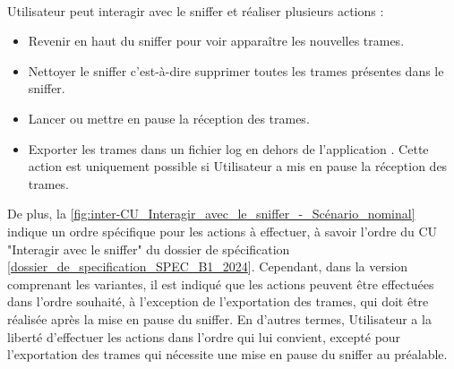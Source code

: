 \\
Utilisateur peut interagir avec le sniffer et réaliser plusieurs actions : 
\begin{itemize}
    \item Revenir en haut du sniffer pour voir apparaître les nouvelles trames. 
    \item Nettoyer le sniffer c'est-à-dire supprimer toutes les trames présentes dans le sniffer. 
    \item Lancer ou mettre en pause la réception des trames. 
    \item Exporter les trames dans un fichier log en dehors de l'application {\nomApplication}. Cette action est uniquement possible si Utilisateur a mis en pause la réception des trames.
\end{itemize}
De plus, la \autoref{fig:inter-CU_Interagir_avec_le_sniffer_-_Scénario_nominal} indique un ordre spécifique pour les actions à effectuer, à savoir l'ordre du CU "Interagir avec le sniffer" du dossier de spécification [\hyperref[SPEC]{dossier\_de\_specification\_SPEC\_B1\_2024}]. Cependant, dans la version comprenant les variantes, il est indiqué que les actions peuvent être effectuées dans l'ordre souhaité, à l'exception de l'exportation des trames, qui doit être réalisée après la mise en pause du sniffer. En d'autres termes, Utilisateur a la liberté d'effectuer les actions dans l'ordre qui lui convient, excepté pour l'exportation des trames qui nécessite une mise en pause du sniffer au préalable.